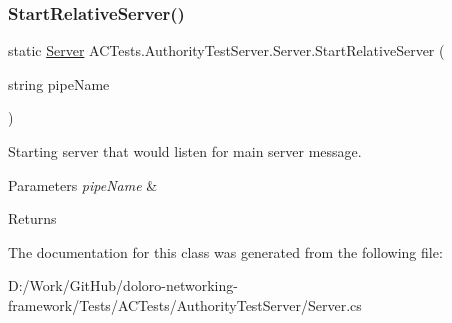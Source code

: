\subsubsection{\texorpdfstring{Start\+Relative\+Server()}{StartRelativeServer()}}
{\footnotesize\ttfamily static \mbox{\hyperlink{class_a_c_tests_1_1_authority_test_server_1_1_server}{Server}} A\+C\+Tests.\+Authority\+Test\+Server.\+Server.\+Start\+Relative\+Server (\begin{DoxyParamCaption}\item[{string}]{pipe\+Name }\end{DoxyParamCaption})\hspace{0.3cm}{\ttfamily [static]}}



Starting server that would listen for main server message. 


\begin{DoxyParams}{Parameters}
{\em pipe\+Name} & \\
\hline
\end{DoxyParams}
\begin{DoxyReturn}{Returns}

\end{DoxyReturn}


The documentation for this class was generated from the following file\+:\begin{DoxyCompactItemize}
\item 
D\+:/\+Work/\+Git\+Hub/doloro-\/networking-\/framework/\+Tests/\+A\+C\+Tests/\+Authority\+Test\+Server/Server.\+cs\end{DoxyCompactItemize}
